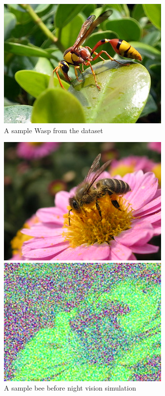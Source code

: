 \documentclass[12pt]{article}
\begin{document}
	\begin{figure}[H]
		\centering
		\includegraphics[width=0.5\linewidth]{Images/Sample/30319869311_5e35d23364_n.jpg}
		\caption{A sample Wasp from the dataset}
		\label{fig:DATA_WASP}
	\end{figure}
	\begin{figure}[H]
		\centering
		\begin{minipage}{0.45\textwidth}
			\includegraphics[width=\textwidth]{Images/Sample/1240800_e5f2b40032_n.jpg}
			\caption{A sample bee before night vision simulation}
			\label{fig:DATA_NORMAL}
		\end{minipage}
		\hfill
		\begin{minipage}{0.45\textwidth}
			\includegraphics[width=\textwidth]{Images/Sample/1240800_e5f2b40032_n-nv.jpg}

\end{minipage}
\end{figure}
\end{document}
